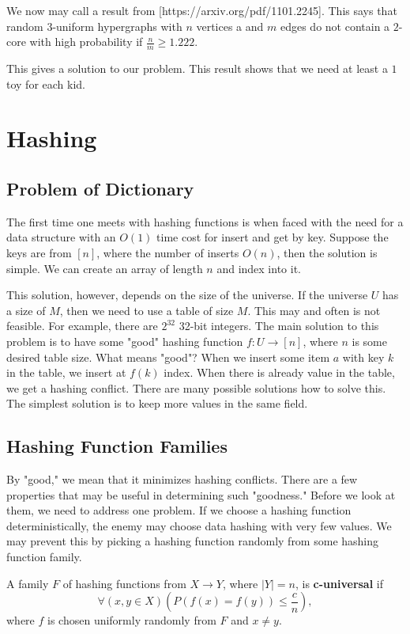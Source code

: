 We now may call a result from [https://arxiv.org/pdf/1101.2245]. This says that random 3-uniform hypergraphs with $n$ vertices a and $m$ edges do not contain a $2$-core with high probability if $\frac{n}{m} \geq 1.222$. 

This gives a solution to our problem. This result shows that we need at least a $1$ toy for each kid.

\section{Hashing}

\subsection{Problem of Dictionary}
The first time one meets with hashing functions is when faced with the need for a data structure with an \(O(1)\) time cost for insert and get by key. Suppose the keys are from \([n]\), where the number of inserts \(O(n)\), then the solution is simple. We can create an array of length \(n\) and index into it. 

This solution, however, depends on the size of the universe. If the universe $U$ has a size of $M$, then we need to use a table of size $M$. This may and often is not feasible. For example, there are $2^{32}$ 32-bit integers. The main solution to this problem is to have some "good" hashing function $f:U \rightarrow [n]$, where $n$ is some desired table size. What means "good"? When we insert some item $a$ with key $k$ in the table, we insert at $f(k)$ index. When there is already value in the table, we get a hashing conflict. There are many possible solutions how to solve this. The simplest solution is to keep more values in the same field.



\subsection{Hashing Function Families}
By "good," we mean that it minimizes hashing conflicts. There are a few properties that may be useful in determining such "goodness." Before we look at them, we need to address one problem. If we choose a hashing function deterministically, the enemy may choose data hashing with very few values. We may prevent this by picking a hashing function randomly from some hashing function family.

\begin{defn}
A family \( F \) of hashing functions from \( X \rightarrow Y \), where \( |Y| = n \), is \textbf{c-universal} if 
\[ \forall (x, y \in X) \left( P\left(f(x) = f(y)\right) \leq \frac{c}{n} \right), \]
where \( f \) is chosen uniformly randomly from \( F \) and \(x \neq y \).
\end{defn}

